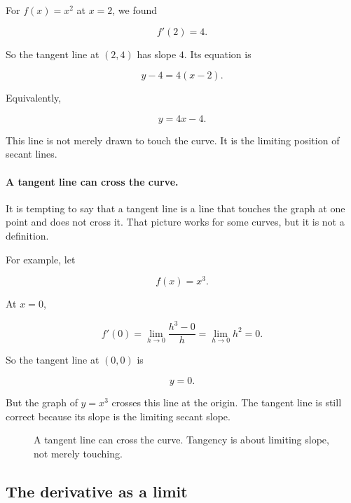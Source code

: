 For \(f(x)=x^2\) at \(x=2\), we found

\[
f'(2)=4.
\]

So the tangent line at \((2,4)\) has slope \(4\).  Its equation is

\[
y-4=4(x-2).
\]

Equivalently,

\[
y=4x-4.
\]

This line is not merely drawn to touch the curve.  It is the limiting position of secant lines.

\paragraph{A tangent line can cross the curve.}
It is tempting to say that a tangent line is a line that touches the graph at one point and does not cross it.  That picture works for some curves, but it is not a definition.

For example, let

\[
f(x)=x^3.
\]

At \(x=0\),

\[
f'(0)
=
\lim_{h\to0}\frac{h^3-0}{h}
=
\lim_{h\to0}h^2
=
0.
\]

So the tangent line at \((0,0)\) is

\[
y=0.
\]

But the graph of \(y=x^3\) crosses this line at the origin.  The tangent line is still correct because its slope is the limiting secant slope.

\begin{figure}[h]
\centering
{}
\caption{A tangent line can cross the curve.  Tangency is about limiting slope, not merely touching.}
\label{fig:cubic-tangent-crosses}
\end{figure}

\subsection{The derivative as a limit}
\label{subsec:derivative-as-limit}


